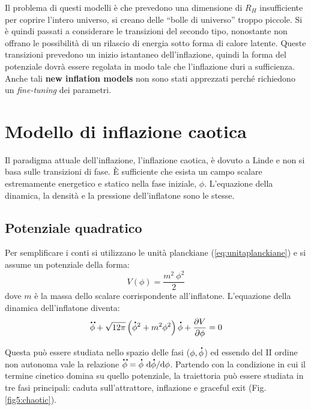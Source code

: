 Il problema di questi modelli è che prevedono una dimensione di $R_H$ insufficiente per coprire l'intero universo, si creano delle ``bolle di universo'' troppo piccole. Si è quindi passati a considerare le transizioni del secondo tipo, nonostante non offrano le possibilità di un rilascio di energia sotto forma di calore latente. Queste transizioni prevedono un inizio istantaneo dell'inflazione, quindi la forma del potenziale dovrà essere regolata in modo tale che l'inflazione duri a sufficienza. Anche tali \textbf{new inflation models} non sono stati apprezzati perché richiedono un \textit{fine-tuning} dei parametri.

\section{Modello di inflazione caotica}
Il paradigma attuale dell'inflazione, l'inflazione caotica, è dovuto a Linde e non si basa sulle transizioni di fase. È sufficiente che esista un campo scalare estremamente energetico e statico nella fase iniziale, $\phi$. L'equazione della dinamica, la densità e la pressione dell'inflatone sono le stesse.
\subsection{Potenziale quadratico}
Per semplificare i conti si utilizzano le unità planckiane (\ref{eq:unitaplanckiane}) e si assume un potenziale della forma:
$$
V(\phi)= \frac{m^2~\phi^2}{2}
$$
dove $m$ è la massa dello scalare corrispondente all'inflatone. L'equazione della dinamica dell'inflatone diventa:
\begin{equation}
    \accentset{\mbox{\large\bfseries ..}}{\phi} + \sqrt{12 \pi} \left( \accentset{\mbox{\large\bfseries .}}{\phi}^2+m^2 \phi^2 \right) \accentset{\mbox{\large\bfseries .}}{\phi} + \frac{\partial V}{\partial \phi} =0
\end{equation}

Questa può essere studiata nello spazio delle fasi ($\phi, \accentset{\mbox{\large\bfseries .}}{\phi}$) ed essendo del II ordine non autonoma vale la relazione $\accentset{\mbox{\large\bfseries ..}}{\phi} = \accentset{\mbox{\large\bfseries .}}{\phi} ~ \mathrm{d} \accentset{\mbox{\large\bfseries .}}{\phi} /\mathrm{d} \phi$. Partendo con la condizione in cui il termine cinetico domina su quello potenziale, la traiettoria può essere studiata in tre fasi principali: caduta sull'attrattore, inflazione e graceful exit (Fig. \ref{fig5:chaotic}).


